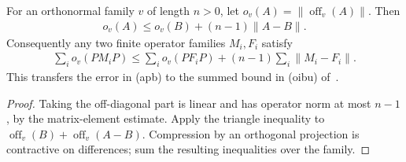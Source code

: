 \begin{lemma}
    \label{thm:hastings05_basis_perturbation}
    \leanok
    For an orthonormal family $v$ of length $n>0$, let
    $o_v(A)=\|\operatorname{off}_v(A)\|$. Then
    \begin{align*}
        o_v(A)\le o_v(B)+(n-1)\|A-B\|.
    \end{align*}
    Consequently any two finite operator families $M_i,F_i$ satisfy
    \begin{align*}
        \sum_i o_v(PM_iP)\le\sum_i o_v(PF_iP)
        +(n-1)\sum_i\|M_i-F_i\|.
    \end{align*}
    This transfers the error in (apb) to the summed bound in (oibu)
    of~\cite[lines 300--320 and 1678--1708]{Hastings2006Solving}.
\end{lemma}
\begin{proof}\leanok
    Taking the off-diagonal part is linear and has operator norm at most
    $n-1$, by the matrix-element estimate. Apply the triangle inequality to
    $\operatorname{off}_v(B)+\operatorname{off}_v(A-B)$.
    Compression by an orthogonal projection is contractive on differences;
    sum the resulting inequalities over the family.
\end{proof}

